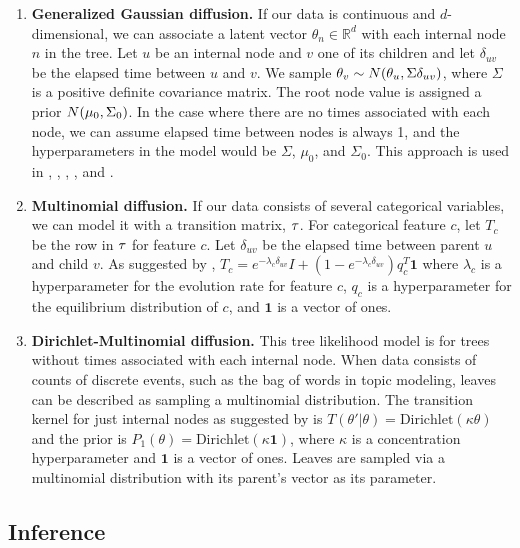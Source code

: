 \begin{enumerate}
    \item \textbf{Generalized Gaussian diffusion.} If our data
    is continuous and $d$-dimensional, we can associate
    a latent vector $\theta_n \in \mathbb{R}^d$ with each internal node
    $n$ in the tree. Let $u$ be an internal node
    and $v$ one of its children and
    let $\delta_{uv}$ be the elapsed time between $u$ and $v$.
    We sample $\theta_v \sim N(\theta_u, \Sigma\delta_{uv})$,
    where $\Sigma$ is a positive definite covariance matrix.
    The root node value is assigned a prior
    $N(\mu_0, \Sigma_0)$.
    In the case where there are no times associated with each node,
    we can assume elapsed time between nodes is always 1,
    and the hyperparameters in the model would be
    $\Sigma$, $\mu_0$, and $\Sigma_0$.
    This approach is used in \citet{Neal2003}, \citet{Teh2008}, \citet{Knowles2015},
    \citet{Adams2010}, \citet{Boyles2012} and \citet{Hu2013}.
    \item \textbf{Multinomial diffusion.} If our data
    consists of several categorical variables, 
    we can model it with a transition matrix, $\tau$.
    For categorical feature $c$, let $T_c$ 
    be the row in $\tau$ for feature $c$.
    Let $\delta_{uv}$ be the elapsed time between parent $u$ and child $v$.
    As suggested by
    \citet{Teh2008},
    $T_{c} = e^{-\lambda_{c}\delta_{uv}}I + (1 -  e^{-\lambda_{c}\delta_{uv}})q_{c}^T\bm{1}$
    where $\lambda_{c}$ is a hyperparameter for the evolution rate for feature 
    $c$, $q_{c}$ is a hyperparameter for the equilibrium
    distribution of $c$, and $\bm{1}$ is a vector of ones.
    \item \textbf{Dirichlet-Multinomial diffusion.}
    This tree likelihood model is for
    trees without times associated with each internal node.
    When data consists of counts of discrete events,
    such as the bag of words in topic modeling,
    leaves can be described as sampling
    a multinomial distribution.
    The transition kernel for
    just internal nodes as suggested by \citet{Adams2010} is $T(\theta' | \theta) = \text{Dirichlet}(\kappa\theta)$
    and the prior is $P_1(\theta) = \text{Dirichlet}(\kappa\bm{1})$,
    where $\kappa$ is a concentration hyperparameter and $\bm{1}$ is a
    vector of ones.
    Leaves are sampled via a multinomial distribution
    with its parent's vector as its parameter.
\end{enumerate}

\subsection{Inference}

